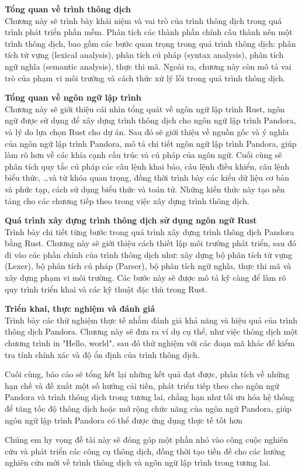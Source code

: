\begin{mucluc}
    
    \item {\bf{Tổng quan về trình thông dịch}}\\
    Chương này sẽ trình bày khái niệm và vai trò của trình thông dịch trong quá trình phát triển phần mềm. Phân tích các thành phần chính cấu thành nên một trình thông dịch, bao gồm các bước quan trọng trong quá trình thông dịch: phân tích từ vựng (lexical analysis), phân tích cú pháp (syntax analysis), phân tích ngữ nghĩa (semantic analysis), thực thi mã. Ngoài ra, chương này còn mô tả vai trò của phạm vi môi trường và cách thức xử lý lỗi trong quá trình thông dịch.
    \item {\bf{Tổng quan về ngôn ngữ lập trình}}\\
    Chương này sẽ giới thiệu cái nhìn tổng quát về ngôn ngữ lập trình Rust, ngôn ngữ được sử dụng để xây dựng trình thông dịch cho ngôn ngữ lập trình Pandora, và lý do lựa chọn Rust cho dự án. Sau đó sẽ giới thiệu về nguồn gốc và ý nghĩa của ngôn ngữ lập trình Pandora, mô tả chi tiết ngôn ngữ lập trình Pandora, giúp làm rõ hơn về các khía cạnh cấu trúc và cú pháp của ngôn ngữ. Cuối cùng sẽ phân tích quy tắc cú pháp các câu lệnh khai báo, câu lệnh điều khiển, câu lệnh biểu thức, \dots và từ khóa quan trọng, đồng thời trình bày các kiểu dữ liệu cơ bản và phức tạp, cách sử dụng biểu thức và toán tử. Những kiến thức này tạo nền tảng cho các chương tiếp theo trong việc xây dựng trình thông dịch.  
    \item {\bf{Quá trình xây dựng trình thông dịch sử dụng ngôn ngữ Rust}}\\
    Trình bày chi tiết từng bước trong quá trình xây dựng trình thông dịch Pandora bằng Rust. Chương này sẽ giới thiệu cách thiết lập môi trường phát triển, sau đó đi vào các phần chính của trình thông dịch như: xây dựng bộ phân tích từ vựng (Lexer), bộ phân tích cú pháp (Parser), bộ phân tích ngữ nghĩa, thực thi mã và xây dựng phạm vi môi trường. Các bước này sẽ được mô tả kỹ càng để làm rõ quy trình triển khai và các kỹ thuật đặc thù trong Rust.
    \item {\bf{Triển khai, thực nghiệm và đánh giá}}\\
    Trình bày các thử nghiệm thực tế nhằm đánh giá khả năng và hiệu quả của trình thông dịch Pandora. Chương này sẽ đưa ra ví dụ cụ thể, như việc thông dịch một chương trình in "Hello, world", sau đó thử nghiệm với các đoạn mã khác để kiểm tra tính chính xác và độ ổn định của trình thông dịch.
\end{mucluc}

Cuối cùng, báo cáo sẽ tổng kết lại những kết quả đạt được, phân tích về những hạn chế và đề xuất một số hướng cải tiến, phát triển tiếp theo cho ngôn ngữ Pandora và trình thông dịch  trong tương lai, chẳng hạn như tối ưu hóa hệ thống để tăng tốc độ thông dịch hoặc mở rộng chức năng của ngôn ngữ Pandora, giúp ngôn ngữ lập trình Pandora có thể được ứng dụng thực tế tốt hơn

Chúng em hy vọng đề tài này sẽ đóng góp một phần nhỏ vào công cuộc nghiên cứu và phát triển các công cụ thông dịch, đồng thời tạo tiền đề cho các hướng nghiên cứu mới về trình thông dịch và ngôn ngữ lập trình trong tương lai.
